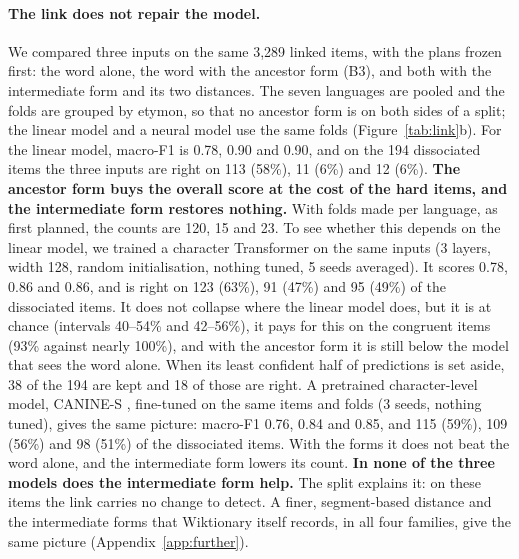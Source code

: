 \documentclass[11pt]{article}
\begin{document}
\paragraph{The link does not repair the model.} We compared three inputs on the same 3,289 linked items, with the plans frozen first: the word alone, the word with the ancestor form (B3), and both with the intermediate form and its two distances. The seven languages are pooled and the folds are grouped by etymon, so that no ancestor form is on both sides of a split; the linear model and a neural model use the same folds (Figure~\ref{tab:link}b). For the linear model, macro-F1 is 0.78, 0.90 and 0.90, and on the 194 dissociated items the three inputs are right on 113 (58\%), 11 (6\%) and 12 (6\%). \textbf{The ancestor form buys the overall score at the cost of the hard items, and the intermediate form restores nothing.} With folds made per language, as first planned, the counts are 120, 15 and 23. To see whether this depends on the linear model, we trained a character Transformer on the same inputs (3 layers, width 128, random initialisation, nothing tuned, 5 seeds averaged). It scores 0.78, 0.86 and 0.86, and is right on 123 (63\%), 91 (47\%) and 95 (49\%) of the dissociated items. It does not collapse where the linear model does, but it is at chance (intervals 40--54\% and 42--56\%), it pays for this on the congruent items (93\% against nearly 100\%), and with the ancestor form it is still below the model that sees the word alone. When its least confident half of predictions is set aside, 38 of the 194 are kept and 18 of those are right. A pretrained character-level model, CANINE-S \citep{clark2022canine}, fine-tuned on the same items and folds (3 seeds, nothing tuned), gives the same picture: macro-F1 0.76, 0.84 and 0.85, and 115 (59\%), 109 (56\%) and 98 (51\%) of the dissociated items. With the forms it does not beat the word alone, and the intermediate form lowers its count. \textbf{In none of the three models does the intermediate form help.} The split explains it: on these items the link carries no change to detect. A finer, segment-based distance and the intermediate forms that Wiktionary itself records, in all four families, give the same picture (Appendix~\ref{app:further}).
\end{document}
